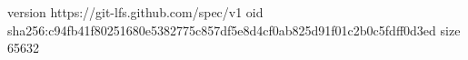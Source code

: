 version https://git-lfs.github.com/spec/v1
oid sha256:c94fb41f80251680e5382775c857df5e8d4cf0ab825d91f01c2b0c5fdff0d3ed
size 65632

